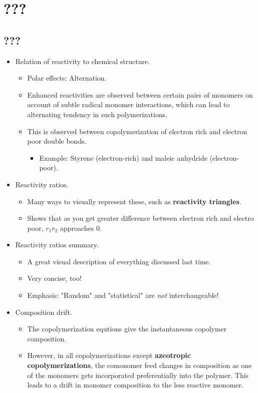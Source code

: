 \documentclass[../notes.tex]{subfiles}
\begin{document}
\chapter{???}
\section{???}
\begin{itemize}
    \item {}Relation of reactivity to chemical structure.
    \begin{itemize}
        \item Polar effects: Alternation.
        \item Enhanced reactivities are observed between certain pairs of monomers on account of subtle radical monomer interactions, which can lead to alternating tendency in such polymerizations.
        \item This is observed between copolymerization of electron rich and electron poor double bonds.
        \begin{itemize}
            \item Example: Styrene (electron-rich) and maleic anhydride (electron-poor).
        \end{itemize}
    \end{itemize}
    \item Reactivity ratios.
    \begin{itemize}
        \item Many ways to visually represent these, such as \textbf{reactivity triangles}.
        \item Shows that as you get greater difference between electron rich and electro poor, $r_1r_2$ approaches 0.
    \end{itemize}
    \item Reactivity ratios summary.
    \begin{itemize}
        \item A great visual description of everything discussed last time.
        \item Very concise, too!
        \item Emphasis: "Random" and "statistical" are \emph{not} interchangeable!
    \end{itemize}
    \item Composition drift.
    \begin{itemize}
        \item The copolymerization equtions give the instantaneous copolymer composition.
        \item However, in all copolymerizations except \textbf{azeotropic copolymerizations}, the comonomer feed changes in composition as one of the monomers gets incorporated preferentially into the polymer. This leads to a drift in monomer composition to the less reactive monomer.

\end{itemize}
\end{itemize}
\end{document}
